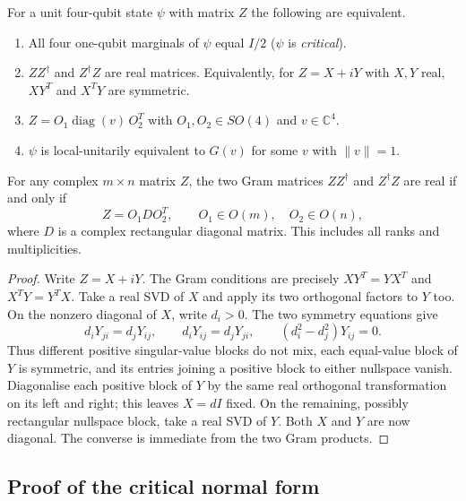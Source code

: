 \begin{theorem}\label{thm:fqe-critical-normal-form}

For a unit four-qubit state $\psi$ with matrix $Z$ the following are equivalent.

\begin{enumerate}
\item All four one-qubit marginals of $\psi$ equal $I/2$ ($\psi$ is \emph{critical}).
\item $ZZ^\dagger$ and $Z^\dagger Z$ are real matrices. Equivalently, for $Z=X+iY$ with $X,Y$ real,
$XY^T$ and $X^TY$ are symmetric.
\item $Z=O_1\operatorname{diag}(v)\,O_2^T$ with $O_1,O_2\in SO(4)$ and $v\in\mathbb C^4$.
\item $\psi$ is local-unitarily equivalent to $G(v)$ for some $v$ with $\|v\|=1$.

\end{enumerate}
\end{theorem}

\begin{lemma}\label{lem:fqe-real-gram}

For any complex $m\times n$ matrix $Z$, the two Gram matrices $ZZ^\dagger$
and $Z^\dagger Z$ are real if and only if
\[
Z=O_1 D O_2^T,\qquad O_1\in O(m),\quad O_2\in O(n),
\]
where $D$ is a complex rectangular diagonal matrix. This includes all ranks
and multiplicities.
\end{lemma}

\begin{proof} Write \(Z=X+iY\). The Gram conditions are precisely \(XY^T=YX^T\) and \(X^TY=Y^TX\).
Take a real SVD of \(X\) and apply its two orthogonal factors to \(Y\) too. On the nonzero diagonal
of \(X\), write \(d_i>0\). The two symmetry equations give \[
d_iY_{ji}=d_jY_{ij},\qquad d_iY_{ij}=d_jY_{ji},
\qquad (d_i^2-d_j^2)Y_{ij}=0.
\] Thus different positive singular-value blocks do not mix, each equal-value block of \(Y\) is
symmetric, and its entries joining a positive block to either nullspace vanish. Diagonalise each
positive block of \(Y\) by the same real orthogonal transformation on its left and right; this
leaves \(X=dI\) fixed. On the remaining, possibly rectangular nullspace block, take a real SVD of
\(Y\). Both \(X\) and \(Y\) are now diagonal. The converse is immediate from the two Gram products.
\end{proof}

\subsection{Proof of the critical normal form}\label{sec:fqe-critical_four_qubit_normal_form-proof-of-theorem}

